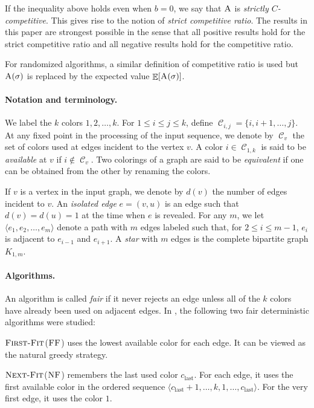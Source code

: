 \documentclass[smallextended]{svjour3}
\newcommand{\colorset}{\ensuremath{\operatorname{\mathcal{C}}}\xspace}
\newcommand{\NF}{\ensuremath{\operatorname{\textsc{Next-Fit}}}\xspace}
\newcommand{\FF}{\ensuremath{\operatorname{\textsc{First-Fit}}}\xspace}
\newcommand{\nf}{\ensuremath{\operatorname{\textsc{NF}}}\xspace}
\newcommand{\ff}{\ensuremath{\operatorname{\textsc{FF}}}\xspace}
\newcommand{\ALG}{\ensuremath{\operatorname{\textsc{A}}}\xspace}
\DeclareMathOperator{\E}{\mathbb{E}}
\begin{document}
If the inequality above holds even when $b=0$, we say that $\ALG$ is \emph{strictly $C$-competitive}. This gives rise to the notion of \emph{strict competitive ratio}. 
The results in this paper are strongest possible in the sense that all positive results hold for the strict competitive ratio and all negative results hold for the competitive ratio.

For randomized algorithms, a similar definition of competitive ratio
is used but $\ALG(\sigma)$ is replaced by the expected value
$\E[\ALG(\sigma)]$.


\paragraph{Notation and terminology.}
We label the $k$ colors $1,2,\ldots , k$. For $1\leq i\leq j\leq k$, define $\colorset_{i,j}=\{i,i+1 ,\ldots , j\}$. At any fixed point in the processing of the input sequence, we
denote by $\colorset_v$ the set of colors used at edges incident to the vertex $v$. A color $i\in \colorset_{1,k}$
is said to be \emph{available} at $v$ if $i\notin \colorset_v$.
Two colorings of a graph are said to be \emph{equivalent} if one can
 be obtained from the other by renaming the colors. 

If $v$ is a vertex in the input graph, we denote by $d(v)$ the number of edges incident to $v$. An \emph{isolated edge} $e=(v,u)$ is an edge such that $d(v)=d(u)=1$ at the time when $e$ is revealed.
For any $m$, we let $\langle e_1, e_2, \ldots, e_m \rangle$ denote a
 path with $m$ edges labeled such that, for $2 \leq i \leq
 m-1$, $e_i$ is adjacent to $e_{i-1}$ and $e_{i+1}$.
A \emph{star} with $m$
edges is the complete bipartite graph $K_{1,m}$.

 
\paragraph{Algorithms.}
An algorithm is called \emph{fair} if it never rejects an edge unless all of the $k$ colors have already been used on adjacent edges.
In \cite{kedge}, the following two fair deterministic algorithms were studied:

\FF (\ff) uses the lowest available color for each edge. It can be viewed as the
natural greedy strategy.

\NF (\nf) remembers the last used color $c_{\text{last}}$. For each edge, it
uses the first available color in the ordered sequence $\langle c_{\text{last}}+1, \ldots , k,
1, \ldots , c_{\text{last}}\rangle$. For the very first edge, it uses the color $1$.
\end{document}

